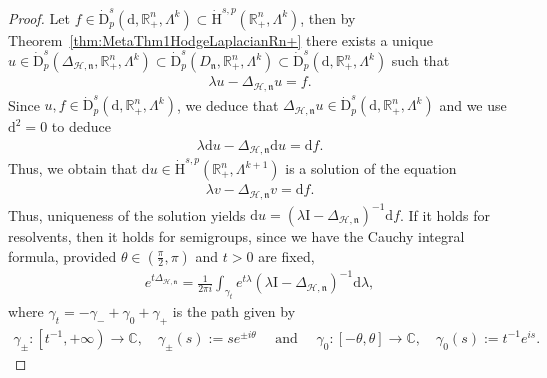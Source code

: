 \documentclass[10pt]{amsart}
\theoremstyle{definition}\newtheorem{defi}[theo]{Definition}\newtheorem{rema}[theo]{Remark}\newtheorem{exam}[theo]{Example}\newtheorem{exem}[theo]{Example}\newtheorem{nota}[theo]{Notation}
\newcommand{\bbR}{\mathbb{R}}
\newcommand{\bbC}{\mathbb{C}}
\newcommand{\rmH}{\mathrm{H}}%
\newcommand{\rmd}{\mathrm{d}}
\newcommand{\rmD}{\mathrm{D}}
\newcommand{\rmI}{\mathrm{I}}
\newcommand{\clH}{\mathcal{H}}
\newcommand{\fkn}{\mathfrak{n}}
\begin{document}
\begin{proof}
Let $f\in\dot{\rmD}^s_{p}(\rmd,\bbR^n_+,\Lambda^k)\subset \dot{\rmH}^{s,p}(\bbR^n_+,\Lambda^k)$, then by Theorem~\ref{thm:MetaThm1HodgeLaplacianRn+} there exists a unique $u\in \dot{\rmD}^s_{p}(\Delta_{\clH,\fkn},\bbR^n_+,\Lambda^k)\subset \dot{\rmD}^s_{p}(D_{\fkn},\bbR^n_+,\Lambda^k)\subset \dot{\rmD}^s_{p}(\rmd,\bbR^n_+,\Lambda^k)$ such that
\begin{align*}
\lambda u -\Delta_{\clH,\fkn} u =f .
\end{align*}
Since $u,f \in \dot{\rmD}^s_{p}(\rmd,\bbR^n_+,\Lambda^k)$, we deduce that $\Delta_{\clH,\fkn}u \in \dot{\rmD}^s_{p}(\rmd,\bbR^n_+,\Lambda^k)$ and we use $\rmd^2=0$ to deduce
\begin{align*}
\lambda \rmd u -\Delta_{\clH,\fkn} \rmd u =\rmd f .
\end{align*}
Thus, we obtain that $\rmd u \in \dot{\rmH}^{s,p}(\bbR^n_+,\Lambda^{k+1})$ is a solution of the equation
\begin{align*}
\lambda v -\Delta_{\clH,\fkn} v = \rmd f .
\end{align*}
Thus, uniqueness of the solution yields $\rmd u = (\lambda \rmI  - \Delta_{\clH,\fkn})^{-1}\rmd f$. If it holds for resolvents, then it holds for semigroups, since we have the Cauchy integral formula, provided $\theta\in(\frac{\pi}{2},\pi)$ and $t>0$ are fixed,
\begin{align*}
e^{t\Delta_{\clH,\fkn}}=\frac{1}{2 \pi i} \int_{\gamma_{t}} e^{t \lambda}(\lambda\rmI -\Delta_{\clH,\fkn})^{-1} \rmd\lambda,
\end{align*}
where $\gamma_{t}=-\gamma_-+\gamma_0+\gamma_+$ is the path given by
\begin{align*}
\gamma_{\pm}:\left[t^{-1}, +\infty\right) \rightarrow \bbC, \quad \gamma_{\pm}(s):=s e^{ \pm i \theta} \quad \text { and } \quad \gamma_0:[-\theta, \theta] \rightarrow \bbC, \quad \gamma_0(s):=t^{-1} e^{i s}.
\end{align*}
\end{proof}
\end{document}
